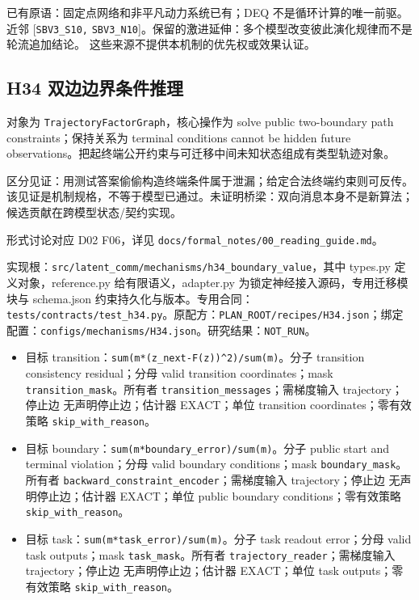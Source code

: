 \documentclass[
  10pt,
]{article}
\begin{document}
已有原语：固定点网络和非平凡动力系统已有；DEQ 不是循环计算的唯一前驱。
近邻 {[}\nolinkurl{SBV3_S10,}
\nolinkurl{SBV3_N10}{]}。保留的激进延伸：多个模型改变彼此演化规律而不是轮流追加结论。
这些来源不提供本机制的优先权或效果认证。

\subsection{H34
双边边界条件推理}\label{h34-ux53ccux8fb9ux8fb9ux754cux6761ux4ef6ux63a8ux7406}

对象为 \nolinkurl{TrajectoryFactorGraph}，核心操作为 solve public
two-boundary path constraints；保持关系为 terminal conditions cannot be
hidden future
observations。把起终端公开约束与可迁移中间未知状态组成有类型轨迹对象。

区分见证：用测试答案偷偷构造终端条件属于泄漏；给定合法终端约束则可反传。
该见证是机制规格，不等于模型已通过。未证明桥梁：双向消息本身不是新算法；候选贡献在跨模型状态/契约实现。

形式讨论对应 D02 F06，详见
{\small\nolinkurl{docs/formal_notes/00_reading_guide.md}}。

实现根：{\small\nolinkurl{src/latent_comm/mechanisms/h34_boundary_value}}，其中
types.py 定义对象，reference.py 给有限语义，adapter.py
为锁定神经接入源码，专用迁移模块与 schema.json
约束持久化与版本。专用合同：{\small\nolinkurl{tests/contracts/test_h34.py}}。原配方：{\small\nolinkurl{PLAN_ROOT/recipes/H34.json}}；绑定配置：{\small\nolinkurl{configs/mechanisms/H34.json}}。研究结果：\nolinkurl{NOT_RUN}。

\begin{itemize}
\item
  目标
  transition：{\small\nolinkurl{sum(m*(z_next-F(z))^2)/sum(m)}}。分子
  transition consistency residual；分母 valid transition
  coordinates；mask \nolinkurl{transition_mask}。所有者
  \nolinkurl{transition_messages}；需梯度输入 trajectory；停止边
  无声明停止边；估计器 EXACT；单位 transition coordinates；零有效策略
  \nolinkurl{skip_with_reason}。
\item
  目标 boundary：{\small\nolinkurl{sum(m*boundary_error)/sum(m)}}。分子
  public start and terminal violation；分母 valid boundary
  conditions；mask \nolinkurl{boundary_mask}。所有者
  \nolinkurl{backward_constraint_encoder}；需梯度输入 trajectory；停止边
  无声明停止边；估计器 EXACT；单位 public boundary
  conditions；零有效策略 \nolinkurl{skip_with_reason}。
\item
  目标 task：{\small\nolinkurl{sum(m*task_error)/sum(m)}}。分子 task
  readout error；分母 valid task outputs；mask
  \nolinkurl{task_mask}。所有者
  \nolinkurl{trajectory_reader}；需梯度输入 trajectory；停止边
  无声明停止边；估计器 EXACT；单位 task outputs；零有效策略
  \nolinkurl{skip_with_reason}。
\end{itemize}
\end{document}
